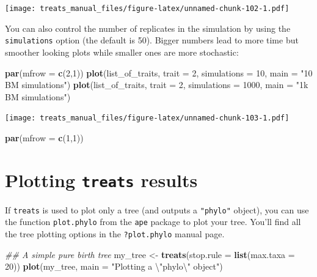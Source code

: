 \documentclass[
]{book}
\newenvironment{Shaded}{\begin{snugshade}}{\end{snugshade}}
\newcommand{\CharTok}[1]{\textcolor[rgb]{0.31,0.60,0.02}{#1}}
\newcommand{\CommentTok}[1]{\textcolor[rgb]{0.56,0.35,0.01}{\textit{#1}}}
\newcommand{\DataTypeTok}[1]{\textcolor[rgb]{0.13,0.29,0.53}{#1}}
\newcommand{\DecValTok}[1]{\textcolor[rgb]{0.00,0.00,0.81}{#1}}
\newcommand{\KeywordTok}[1]{\textcolor[rgb]{0.13,0.29,0.53}{\textbf{#1}}}
\newcommand{\NormalTok}[1]{#1}
\newcommand{\StringTok}[1]{\textcolor[rgb]{0.31,0.60,0.02}{#1}}
\begin{document}
\texttt{[image: treats\_manual\_files/figure-latex/unnamed-chunk-102-1.pdf]}

You can also control the number of replicates in the simulation by using the \texttt{simulations} option (the default is 50).
Bigger numbers lead to more time but smoother looking plots while smaller ones are more stochastic:

\begin{Shaded}
\begin{Highlighting}[]
\KeywordTok{par}\NormalTok{(}\DataTypeTok{mfrow =} \KeywordTok{c}\NormalTok{(}\DecValTok{2}\NormalTok{,}\DecValTok{1}\NormalTok{))}
\KeywordTok{plot}\NormalTok{(list\_of\_traits, }\DataTypeTok{trait =} \DecValTok{2}\NormalTok{, }\DataTypeTok{simulations =} \DecValTok{10}\NormalTok{, }\DataTypeTok{main =} \StringTok{"10 BM simulations"}\NormalTok{)}
\KeywordTok{plot}\NormalTok{(list\_of\_traits, }\DataTypeTok{trait =} \DecValTok{2}\NormalTok{, }\DataTypeTok{simulations =} \DecValTok{1000}\NormalTok{, }\DataTypeTok{main =} \StringTok{"1k BM simulations"}\NormalTok{)}
\end{Highlighting}
\end{Shaded}

\texttt{[image: treats\_manual\_files/figure-latex/unnamed-chunk-103-1.pdf]}

\begin{Shaded}
\begin{Highlighting}[]
\KeywordTok{par}\NormalTok{(}\DataTypeTok{mfrow =} \KeywordTok{c}\NormalTok{(}\DecValTok{1}\NormalTok{,}\DecValTok{1}\NormalTok{))}
\end{Highlighting}
\end{Shaded}

\hypertarget{plotting-treats-results}{%
\section{\texorpdfstring{Plotting \texttt{treats} results}{Plotting treats results}}\label{plotting-treats-results}}

If \texttt{treats} is used to plot only a tree (and outputs a \texttt{"phylo"} object), you can use the function \texttt{plot.phylo} from the \texttt{ape} package to plot your tree.
You'll find all the tree plotting options in the \texttt{?plot.phylo} manual page.

\begin{Shaded}
\begin{Highlighting}[]
\CommentTok{\#\# A simple pure birth tree}
\NormalTok{my\_tree \textless{}{-}}\StringTok{ }\KeywordTok{treats}\NormalTok{(}\DataTypeTok{stop.rule =} \KeywordTok{list}\NormalTok{(}\DataTypeTok{max.taxa =} \DecValTok{20}\NormalTok{))}
\KeywordTok{plot}\NormalTok{(my\_tree, }\DataTypeTok{main =} \StringTok{"Plotting a }\CharTok{\textbackslash{}"}\StringTok{phylo}\CharTok{\textbackslash{}"}\StringTok{ object"}\NormalTok{)}
\end{Highlighting}
\end{Shaded}
\end{document}
